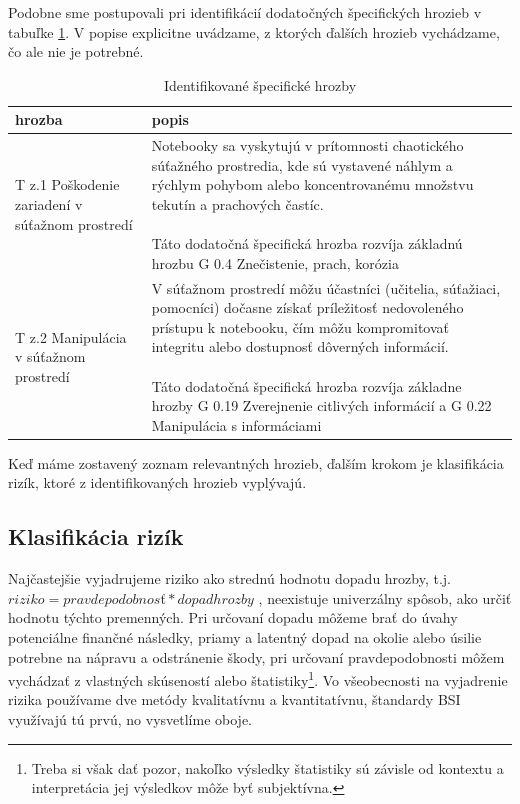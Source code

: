 Podobne sme postupovali pri identifikácií dodatočných špecifických hrozieb v tabuľke \ref{tab:specthreatid}. V popise explicitne uvádzame,
z ktorých ďalších hrozieb vychádzame, čo ale nie je potrebné.
\begin{table}[h!]
    \caption{Identifikované špecifické hrozby}
    \label{tab:specthreatid}
    \begin{center}
        \footnotesize
        \begin{tabular}{ |p{}|p{}| }
        \hline
        hrozba & popis \\
        \hline
        \hline
        T z.1 Poškodenie zariadení v súťažnom prostredí &
        \parbox[t]{0.80\textwidth}{
        Notebooky sa vyskytujú v prítomnosti chaotického súťažného prostredia, kde sú vystavené náhlym a rýchlym pohybom alebo koncentrovanému
        množstvu tekutín a prachových častíc. \\\\ Táto dodatočná špecifická hrozba rozvíja základnú hrozbu G 0.4 Znečistenie, prach, korózia 
        }\\

        \hline
        T z.2 Manipulácia v súťažnom prostredí &
        \parbox[t]{0.80\textwidth}{
        V súťažnom prostredí môžu účastníci (učitelia, súťažiaci, pomocníci) dočasne získať príležitosť nedovoleného prístupu k notebooku, čím
        môžu kompromitovať integritu alebo dostupnosť dôverných informácií. \\\\ Táto dodatočná špecifická hrozba rozvíja základne hrozby 
        G 0.19 Zverejnenie citlivých informácií a G 0.22 Manipulácia s informáciami 
        }\\
        \hline
        \end{tabular}
    \end{center}
\end{table}
Keď máme zostavený zoznam relevantných hrozieb, ďalším krokom je klasifikácia rizík, ktoré z identifikovaných hrozieb vyplývajú.

\subsection{Klasifikácia rizík}

Najčastejšie vyjadrujeme riziko ako strednú hodnotu dopadu hrozby, t.j. $riziko = pravdepodobnosť * dopad hrozby$ \cite{MFSRIB}, neexistuje
univerzálny spôsob, ako určiť hodnotu týchto premenných. Pri určovaní dopadu môžeme brať do úvahy potenciálne finančné následky, priamy a
latentný dopad na okolie alebo úsilie potrebne na nápravu a odstránenie škody, pri určovaní pravdepodobnosti môžem vychádzať z vlastných skúseností 
alebo štatistiky\footnote{Treba si však dať pozor, nakoľko výsledky štatistiky sú závisle od kontextu a interpretácia jej výsledkov  môže
byť subjektívna.}. Vo všeobecnosti na vyjadrenie rizika používame dve metódy kvalitatívnu a kvantitatívnu, štandardy BSI využívajú tú prvú,
no vysvetlíme oboje.

